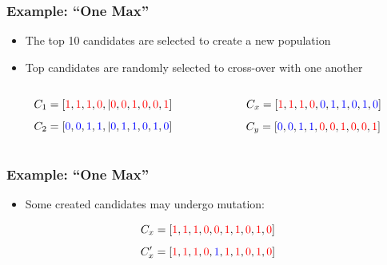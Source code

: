 \documentclass{beamer}
\begin{document}
\begin{frame}
  \frametitle{Example: ``One Max''}
\begin{itemize}
\item The top 10 candidates are selected to create a new population
\item Top candidates are randomly selected to cross-over with one another
\end{itemize}

  \begin{columns}
  \begin{column}{0.5\textwidth}

\[
C_1=[ \textcolor{red}{1},  \textcolor{red}{1}, \textcolor{red}{1},  \textcolor{red}{0},|  \textcolor{red}{0},  \textcolor{red}{0}, \textcolor{red}{1}, \textcolor{red}{0}, \textcolor{red}{0}, \textcolor{red}{1} ]
\]
\[C_2=[  \textcolor{blue}{0}, \textcolor{blue}{0}, \textcolor{blue}{1}, \textcolor{blue}{1},| \textcolor{blue}{0}, \textcolor{blue}{1}, \textcolor{blue}{1}, \textcolor{blue}{0}, \textcolor{blue}{1}, \textcolor{blue}{0} ]
\]
\end{column}
 \begin{column}{0.5\textwidth}

   \[
C_x=[ \textcolor{red}{1},  \textcolor{red}{1}, \textcolor{red}{1},  \textcolor{red}{0}, \textcolor{blue}{0}, \textcolor{blue}{1}, \textcolor{blue}{1}, \textcolor{blue}{0}, \textcolor{blue}{1}, \textcolor{blue}{0} ]
\]
\[C_y = [  \textcolor{blue}{0}, \textcolor{blue}{0}, \textcolor{blue}{1}, \textcolor{blue}{1}, \textcolor{red}{0},  \textcolor{red}{0}, \textcolor{red}{1}, \textcolor{red}{0}, \textcolor{red}{0}, \textcolor{red}{1} ]
\]
  \end{column}
  \end{columns}
\end{frame}

\begin{frame}
  \frametitle{Example: ``One Max''}
\begin{itemize}
  \item Some created candidates may undergo mutation:
\end{itemize}
\[
C_x=[ \textcolor{red}{1},  \textcolor{red}{1}, \textcolor{red}{1},  \textcolor{red}{0}, \textcolor{red}{0}, \textcolor{red}{1}, \textcolor{red}{1}, \textcolor{red}{0}, \textcolor{red}{1}, \textcolor{red}{0} ]
\]
\[C_x'=[ \textcolor{red}{1},  \textcolor{red}{1}, \textcolor{red}{1},  \textcolor{red}{0}, \textcolor{blue}{1}, \textcolor{red}{1}, \textcolor{red}{1}, \textcolor{red}{0}, \textcolor{red}{1}, \textcolor{red}{0} ]
\]
\end{frame}
\end{document}
